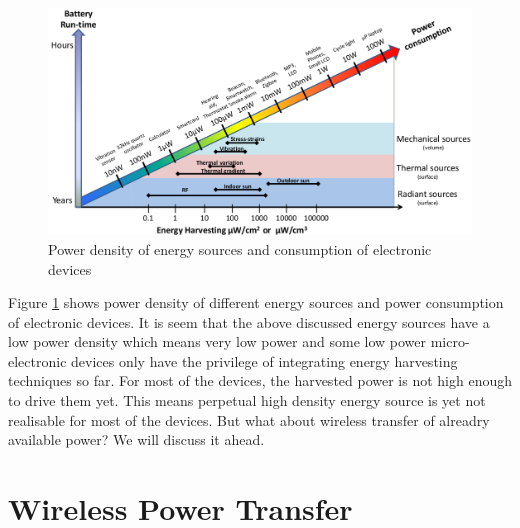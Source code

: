 \documentclass[12pt,a4paper,UKenglish]{report}
\begin{document}
\begin{figure}[H] %
   \centering
   \includegraphics[width=\textwidth]{img/power_density_2.png}
   \caption{Power density of energy sources and consumption of electronic devices \cite{power_density}}
   \label{fig:power_density}
\end{figure}

Figure \ref{fig:power_density} shows power density of different energy sources and power consumption of electronic 
devices. It is seem  that the above discussed energy sources have a low power density which means very low power 
and some low power micro-electronic devices only have the privilege of integrating energy harvesting techniques 
so far. For most of the devices, the harvested power is not high enough to drive them yet. This means perpetual 
high density energy source is yet not realisable for most of the devices. But what about wireless transfer of 
alreadry available power? We will discuss it ahead. 


\section{Wireless Power Transfer}
\end{document}
